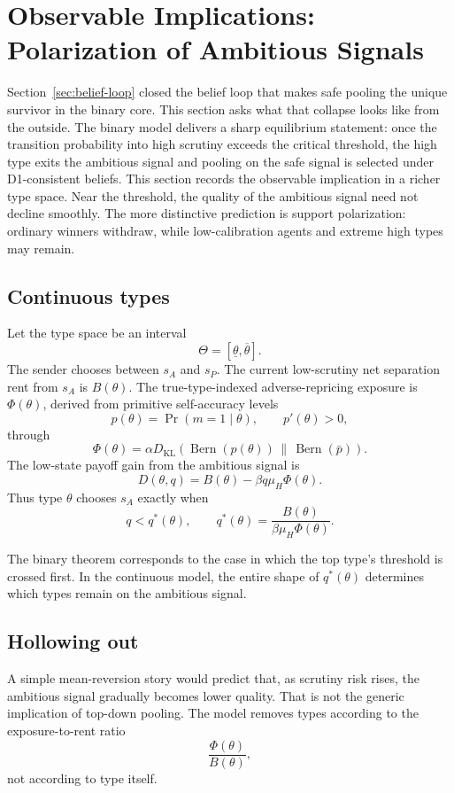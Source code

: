 \section{Observable Implications: Polarization of Ambitious Signals}
\label{sec:polarization}

Section~\ref{sec:belief-loop} closed the belief loop that makes safe pooling the unique survivor in the binary core. This section asks what that collapse looks like from the outside. The binary model delivers a sharp equilibrium statement: once the transition probability into high scrutiny exceeds the critical threshold, the high type exits the ambitious signal and pooling on the safe signal is selected under D1-consistent beliefs. This section records the observable implication in a richer type space. Near the threshold, the quality of the ambitious signal need not decline smoothly. The more distinctive prediction is support polarization: ordinary winners withdraw, while low-calibration agents and extreme high types may remain.

\subsection{Continuous types}

Let the type space be an interval
\[
\Theta=[\underline\theta,\overline\theta].
\]
The sender chooses between \(s_A\) and \(s_P\). The current low-scrutiny net separation rent from \(s_A\) is \(B(\theta)\). The true-type-indexed adverse-repricing exposure is \(\Phi(\theta)\), derived from primitive self-accuracy levels
\[
p(\theta)=\Pr(m=1\mid \theta),
\qquad
p'(\theta)>0,
\]
through
\[
\Phi(\theta)=
\alpha D_{\mathrm{KL}}
\left(
\operatorname{Bern}(p(\theta))
\,\middle\|\,
\operatorname{Bern}(\bar p)
\right).
\]
The low-state payoff gain from the ambitious signal is
\[
D(\theta,q)=B(\theta)-\beta q\mu_H\Phi(\theta).
\]
Thus type \(\theta\) chooses \(s_A\) exactly when
\[
q<q^*(\theta),
\qquad
q^*(\theta)=\frac{B(\theta)}{\beta\mu_H\Phi(\theta)}.
\]

The binary theorem corresponds to the case in which the top type's threshold is crossed first. In the continuous model, the entire shape of \(q^*(\theta)\) determines which types remain on the ambitious signal.

\subsection{Hollowing out}

A simple mean-reversion story would predict that, as scrutiny risk rises, the ambitious signal gradually becomes lower quality. That is not the generic implication of top-down pooling. The model removes types according to the exposure-to-rent ratio
\[
\frac{\Phi(\theta)}{B(\theta)},
\]
not according to type itself.

